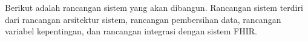 Berikut adalah rancangan sistem yang akan dibangun. Rancangan sistem terdiri dari rancangan arsitektur sistem, rancangan pembersihan data, rancangan variabel kepentingan, dan rancangan integrasi dengan sistem FHIR.

